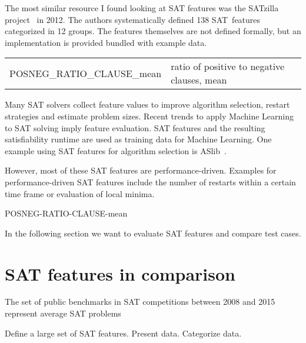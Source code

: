 The most similar resource I found looking at SAT features was the
SATzilla project~\cite{satzilla2004,satzilla2008} in 2012. The authors systematically defined
138 SAT~features categorized in 12 groups. The features themselves are not
defined formally, but an implementation is provided bundled with example data.

\begin{table}[!h]
  \begin{center}
    \begin{tabular}{rl}
      \small{POSNEG\_RATIO\_CLAUSE\_mean} & ratio of positive to negative clauses, mean
    \end{tabular}
  \end{center}
\end{table}

Many SAT solvers collect feature values to improve algorithm selection,
restart strategies and estimate problem sizes. Recent trends to apply Machine
Learning to SAT solving imply feature evaluation. SAT features and the resulting
satisfiability runtime are used as training data for Machine Learning. One example
using SAT features for algorithm selection is ASlib~\cite{aslib}.

However, most of these SAT features are performance-driven.
Examples for performance-driven SAT features include the number of
restarts within a certain time frame or evaluation of local minima.



POSNEG-RATIO-CLAUSE-mean

In the following section we want to evaluate SAT features and
compare test cases.

\section{SAT features in comparison}

\begin{prop}
  The set of public benchmarks in SAT competitions between 2008 and 2015
  represent average SAT problems
\end{prop}

Define a large set of SAT features.
Present data.
Categorize data.

